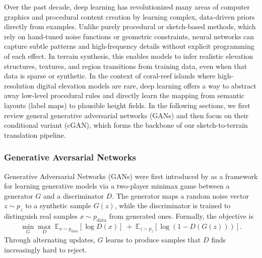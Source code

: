 
Over the past decade, deep learning has revolutionized many areas of computer graphics and procedural content creation by learning complex, data-driven priors directly from examples. Unlike purely procedural or sketch-based methods, which rely on hand-tuned noise functions or geometric constraints, neural networks can capture subtle patterns and high-frequency details without explicit programming of each effect. In terrain synthesis, this enables models to infer realistic elevation structures, textures, and region transitions from training data, even when that data is sparse or synthetic. In the context of coral-reef islands where high-resolution digital elevation models are rare, deep learning offers a way to abstract away low-level procedural rules and directly learn the mapping from semantic layouts (label maps) to plausible height fields. In the following sections, we first review general generative adversarial networks (GANs) and then focus on their conditional variant (cGAN), which forms the backbone of our sketch-to-terrain translation pipeline.

\subsubsection{Generative Aversarial Networks}
\label{sec:coral-island_sota-GAN}

Generative Adversarial Networks (GANs) were first introduced by \cite{Goodfellow2014} as a framework for learning generative models via a two-player minimax game between a generator $G$ and a discriminator $D$.  The generator maps a random noise vector $z\sim p_z$ to a synthetic sample $G(z)$, while the discriminator is trained to distinguish real samples $x\sim p_{\text{data}}$ from generated ones.  Formally, the objective is
\begin{align}
    \min_G \max_D \; \mathbb{E}_{x\sim p_{\text{data}}}[\log D(x)] \;+\;
    \mathbb{E}_{z\sim p_z}[\log(1 - D(G(z)))].   \nonumber
\end{align}
Through alternating updates, $G$ learns to produce samples that $D$ finds increasingly hard to reject.  

